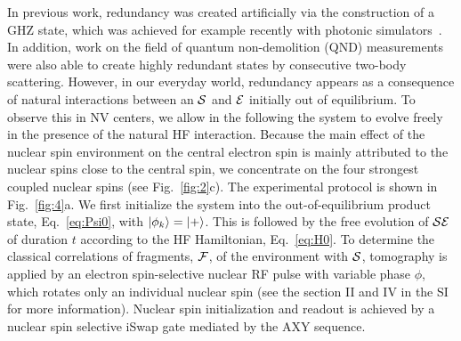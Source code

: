 \documentclass[aps,prl,floatfix,twocolumn,footinbib,superscriptaddress]{revtex4-1}
\begin{document}
In previous work, redundancy was created artificially via the construction of a GHZ state, which was achieved for example recently with photonic simulators~\cite{Ciampini18-1,Chen18-1}. In addition, work on the field of quantum non-demolition (QND)  measurements \cite{Nogues99,Gleyzes07,Lupascu07,Neumann542} were also able to create highly redundant states by consecutive two-body scattering. However, in our everyday world, redundancy appears as a consequence of natural interactions between an $\S$ and $\E$ initially out of equilibrium. To observe this in NV centers, we allow in the following the system to evolve freely in the presence of the natural HF interaction. Because the main effect of the nuclear spin environment on the central electron spin is mainly attributed to the nuclear spins close to the central spin, we concentrate on the four strongest coupled nuclear spins (see Fig.~\ref{fig:2}c). The experimental protocol is shown in Fig.~\ref{fig:4}a. We first initialize the system into the out-of-equilibrium product state, Eq.~\eqref{eq:Psi0}, with $\ket{\phi_k}=\ket{+}$. This is followed by the free evolution of $\S\E$ of duration $t$ according to the HF Hamiltonian, Eq.~\eqref{eq:H0}. To determine the classical correlations of fragments, $\F$, of the environment with $\S$, tomography is applied by an electron spin-selective nuclear RF pulse with variable phase $\phi$, which rotates only an individual nuclear spin (see the section \RN{2} and \RN{4} in the SI for more information). Nuclear spin initialization and readout is achieved by a nuclear spin selective iSwap gate mediated by the AXY sequence.
\end{document}
